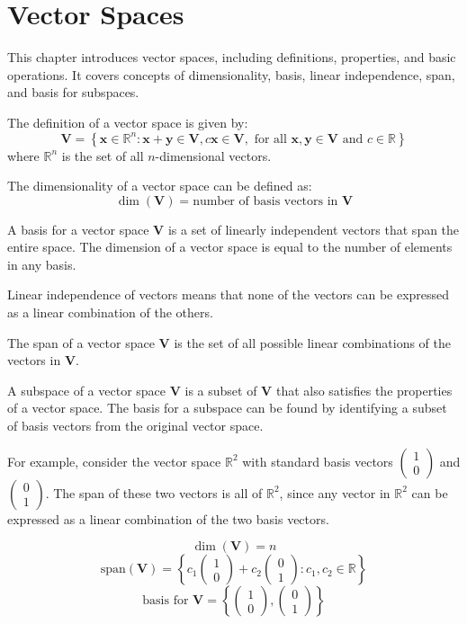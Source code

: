 \section*{Vector Spaces}

This chapter introduces vector spaces, including definitions, properties, and basic operations. It covers concepts of dimensionality, basis, linear independence, span, and basis for subspaces.

The definition of a vector space is given by:
\[
 \mathbf{V} = \left\{ \mathbf{x} \in \mathbb{R}^n : \mathbf{x} + \mathbf{y} \in \mathbf{V}, c\mathbf{x} \in \mathbf{V}, \text{ for all } \mathbf{x}, \mathbf{y} \in \mathbf{V} \text{ and } c \in \mathbb{R} \right\}
\]
where $\mathbb{R}^n$ is the set of all $n$-dimensional vectors.

The dimensionality of a vector space can be defined as:
\[
\dim(\mathbf{V}) = \text{number of basis vectors in }\mathbf{V}
\]

A basis for a vector space $\mathbf{V}$ is a set of linearly independent vectors that span the entire space. The dimension of a vector space is equal to the number of elements in any basis.

Linear independence of vectors means that none of the vectors can be expressed as a linear combination of the others.

The span of a vector space $\mathbf{V}$ is the set of all possible linear combinations of the vectors in $\mathbf{V}$.

A subspace of a vector space $\mathbf{V}$ is a subset of $\mathbf{V}$ that also satisfies the properties of a vector space. The basis for a subspace can be found by identifying a subset of basis vectors from the original vector space.

For example, consider the vector space $\mathbb{R}^2$ with standard basis vectors $\begin{pmatrix} 1 \\ 0 \end{pmatrix}$ and $\begin{pmatrix} 0 \\ 1 \end{pmatrix}$. The span of these two vectors is all of $\mathbb{R}^2$, since any vector in $\mathbb{R}^2$ can be expressed as a linear combination of the two basis vectors.

\[
\dim(\mathbf{V}) = n
\]
\[
\text{span}(\mathbf{V}) = \left\{ c_1\begin{pmatrix} 1 \\ 0 \end{pmatrix} + c_2\begin{pmatrix} 0 \\ 1 \end{pmatrix} : c_1, c_2 \in \mathbb{R} \right\}
\]
\[
\text{basis for }\mathbf{V} = \left\{ \begin{pmatrix} 1 \\ 0 \end{pmatrix}, \begin{pmatrix} 0 \\ 1 \end{pmatrix} \right\}
\]